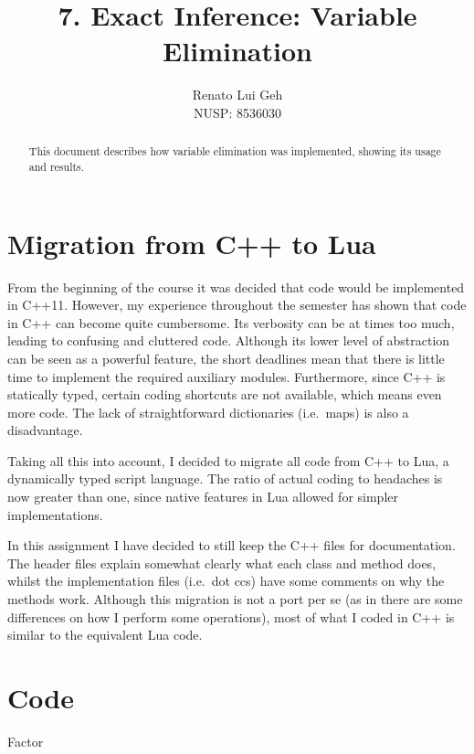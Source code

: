 \documentclass{amsart}
\title[]{7. Exact Inference: Variable Elimination}
\author[]{Renato Lui Geh\\NUSP\@: 8536030}
\makeatletter
\def\subsection{\@startsection{subsection}{3}%
  \z@{.5\linespacing\@plus.7\linespacing}{.1\linespacing}%
  {\normalfont\itshape}}
\theoremstyle{plain}
\makeatother
\begin{document}
\begin{abstract}
  This document describes how variable elimination was implemented, showing its usage and
  results.
  \vspace*{-2.5em}
\end{abstract}

\maketitle

\section{Migration from C++ to Lua}

From the beginning of the course it was decided that code would be implemented in C++11. However,
my experience throughout the semester has shown that code in C++ can become quite cumbersome. Its
verbosity can be at times too much, leading to confusing and cluttered code. Although its lower
level of abstraction can be seen as a powerful feature, the short deadlines mean that there is
little time to implement the required auxiliary modules. Furthermore, since C++ is statically
typed, certain coding shortcuts are not available, which means even more code. The lack of
straightforward dictionaries (i.e.\ maps) is also a disadvantage.

Taking all this into account, I decided to migrate all code from C++ to Lua, a dynamically typed
script language. The ratio of actual coding to headaches is now greater than one, since native
features in Lua allowed for simpler implementations.

In this assignment I have decided to still keep the C++ files for documentation. The header files
explain somewhat clearly what each class and method does, whilst the implementation files (i.e.\
dot ccs) have some comments on why the methods work. Although this migration is not a port per se
(as in there are some differences on how I perform some operations), most of what I coded in C++ is
similar to the equivalent Lua code.

\section{Code}

\subsection{Factor}
\end{document}
